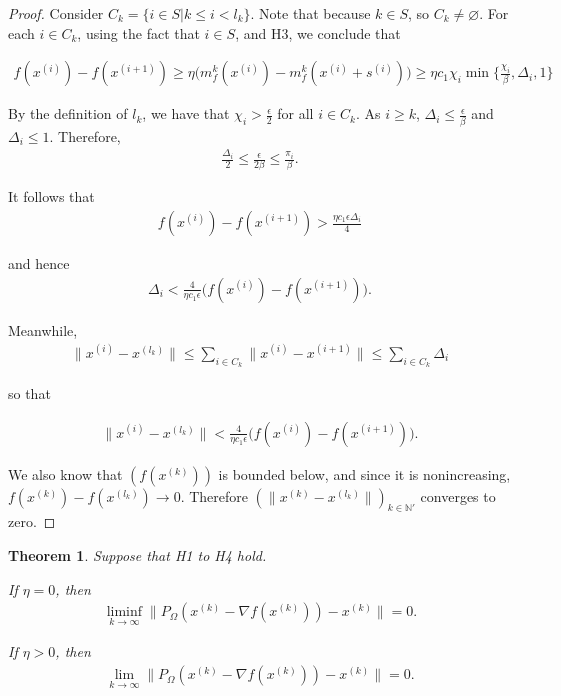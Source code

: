 \documentclass{article}
\newtheorem{theorem}{Theorem}
\newcommand{\grad}{\nabla f}
\newcommand{\xk}{{x}^{(k)}}
\newcommand{\ints}{\mathbb N}
\newcommand{\mk}{{m_f^{k}}}
\begin{document}
\begin{proof}
Consider $C_k = \{i \in S | k \le i < l_k\}$.
Note that because $k \in S$, so $C_k \ne \varnothing $.
For each $i \in C_k$, using the fact that $i \in S$, and H3, we conclude that 

\begin{align}
f(x^{(i)}) - f(x^{(i+1)}) \ge \eta\big ( \mk(x^{(i)}) - \mk(x^{(i)} + s^{(i)}) \big ) \ge \eta c_1 \chi_i \min\{\frac{\chi_{i}}{\beta}, \Delta_i, 1\} 
\end{align}

By the definition of $l_k$, we have that $\chi_i > \frac{\epsilon}{2}$ for all $i \in C_k$.
As $i \ge k$, $\Delta_i \le \frac{\epsilon}{\beta}$ and $\Delta_i \le 1$.
Therefore,
\begin{align}
\frac{\Delta_i}{2} \le \frac{\epsilon}{2\beta} \le \frac{\pi_i}{\beta}.
\end{align}

It follows that
\begin{align}
f(x^{(i)}) - f(x^{(i+1)}) > \frac{\eta c_1 \epsilon \Delta_i}{4}
\end{align}

and hence
\begin{align}
\Delta_i < \frac{4}{\eta c_1 \epsilon} \big ( f(x^{(i)}) - f(x^{(i+1)})\big ).
\end{align}

Meanwhile,
\begin{align}
\|x^{(i)} - x^{(l_k)}\| \le \sum_{i \in C_k}\|x^{(i)} - x^{(i+1)}\| \le \sum_{i \in C_k} \Delta_i
\end{align}

so that

\begin{align}
\|x^{(i)} - x^{(l_k)}\| < \frac{4}{\eta c_1 \epsilon} \big ( f(x^{(i)}) - f(x^{(i+1)})\big ).
\end{align}

We also know that $(f(\xk))$ is bounded below, and since it is nonincreasing, $f(\xk)  - f(x^{(l_k)}) \to 0$.
Therefore $(\|\xk - x^{(l_k)}\|)_{k \in \ints '}$ converges to zero.

\end{proof}


\begin{theorem}
Suppose that H1 to H4 hold.

If $\eta = 0$, then
\begin{align}
\liminf_{k\to\infty} \|P_{\Omega}(\xk - \grad(\xk)) - \xk \| = 0.
\end{align}

If $\eta > 0$, then
\begin{align}
\lim_{k\to\infty} \|P_{\Omega}(\xk - \grad(\xk)) - \xk \| = 0.
\end{align}

\end{theorem}
\end{document}
